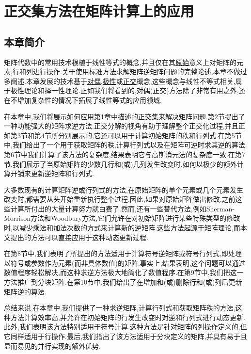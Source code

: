 \chapter{正交集方法在矩阵计算上的应用}

\section{本章简介}

矩阵代数中的常用技术根植于线性等式的概念,并且仅在其\underline{原始}意义上对矩阵的元素,行和列进行操作.关于使用标准方法求解矩阵逆矩阵问题的完整论述,本章不做过多阐述.本章发展的技术基于\underline{对偶},\underline{极性}或\underline{正交}概念,这些概念与线性不等式相关,属于极性理论和择一性理论.正如我们将看到的,对偶(正交)方法除了非常有用之外,还在不增加复杂性的情况下拓展了线性等式的应用领域.

在本章中,我们将展示如何应用第1章中描述的正交集来解决矩阵问题.第2节提出了一种功能强大的矩阵求逆方法.正交分解的视角有助于理解整个正交化过程,并且正如第3节和第4节所分别展示的,它还可以用于计算初始矩阵的秩和行列式.在第5节中,我们给出了一个用于获取矩阵的秩,计算行列式以及在矩阵可逆时求其逆的算法.第6节中我们计算了该方法的复杂度,结果表明它与高斯消元法的复杂度一致.在第7节,我们展示了当原始矩阵的少数几行和(或)几列发生改变时,如何以极少的额外计算开销来更新逆矩阵和行列式.

大多数现有的计算矩阵逆或行列式的方法,在原始矩阵的单个元素或几个元素发生改变时,都需要从头开始重新执行整个过程.因此,如果对原始矩阵做出修改,之前这些计算所付出的大量计算努力就白费了.然而,还有一些替代方法,例如Sherman-Morrison方法和Woodbury方法,它们允许在对初始矩阵进行某些特殊类型的修改时,以减少乘法和加法次数的方式来计算新的逆矩阵.这些方法起源于矩阵理论,而本文提出的方法可以直接应用于这种动态更新过程.

在第8节中,我们表明了所提出的方法适用于计算符号逆矩阵或符号行列式,即处理以符号或参数作为元素(而非具体数值)的矩阵.事实上,结果表明,这个问题可以通过数值程序轻松解决,而这种求逆方法极大地简化了数值程序.在第9节中,我们把这一方法推广到分块矩阵.在第10节中,我们给出了在增加和(或)删除行和(或)列后更新矩阵逆的算法.

总结来说,在本章中,我们提供了一种求逆矩阵,计算行列式和获取矩阵秩的方法,这种方法计算效率高,并允许在初始矩阵的行发生改变时对逆和行列式进行动态更新.此外,我们表明该方法特别适用于符号计算.这种方法是针对矩阵的列操作定义的,但它同样适用于行操作.最后,我们指出了该方法适用于分块定义的矩阵,并具有易于且显而易见的并行实现的额外优势.